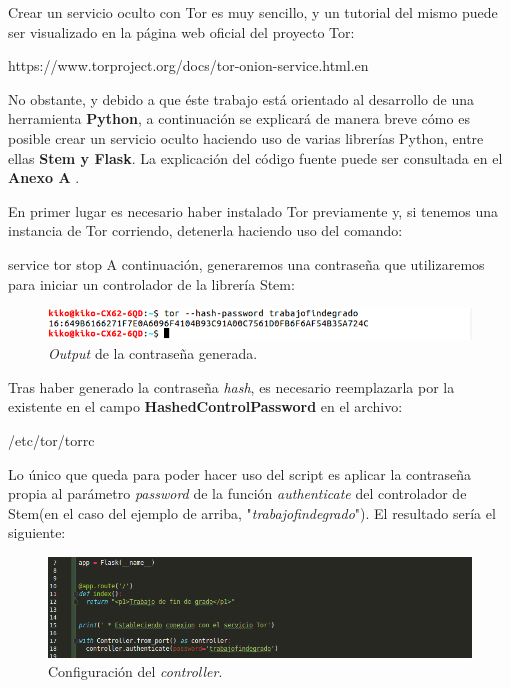 Crear un servicio oculto con Tor es muy sencillo, y un tutorial del mismo puede ser visualizado en la página web oficial del proyecto Tor:

	{\selectfont 
		https://www.torproject.org/docs/tor-onion-service.html.en
	}

No obstante, y debido a que éste trabajo está orientado al desarrollo de una herramienta \textbf{Python}, a continuación se explicará de manera breve cómo es posible crear un servicio oculto haciendo uso de varias librerías Python, entre ellas \textbf{Stem y Flask}.
La explicación del código fuente puede ser consultada en el \textbf{Anexo A }.

En primer lugar es necesario haber instalado Tor previamente y, si tenemos una instancia de Tor corriendo, detenerla haciendo uso del comando:

	{\selectfont 
		service tor stop
	}
A continuación, generaremos una contraseña que utilizaremos para iniciar un controlador de la librería Stem:

	\begin{figure}[h]
		\centerline{
			\mbox{\includegraphics[width=5.00in]{images/hashed_pwd.png}}
		}
		\caption{\textit{Output} de la contraseña generada.}
		\label{fig:TorPwd}
	\end{figure}
	
Tras haber generado la contraseña \textit{hash}, es necesario reemplazarla por la existente en el campo \textbf{HashedControlPassword} en el archivo:

	{\selectfont 
		/etc/tor/torrc
	}

Lo único que queda para poder hacer uso del script es aplicar la contraseña propia al parámetro \textit{password} de la función \textit{authenticate} del controlador de Stem(en el caso del ejemplo de arriba, "\textit{trabajofindegrado}"). El resultado sería el siguiente:
\newpage
	\begin{figure}[h]
		\centerline{
			\mbox{\includegraphics[width=5.00in]{images/controller_auth.png}}
		}
		\caption{Configuración del \textit{controller}.}
		\label{fig:controller}
	\end{figure}

